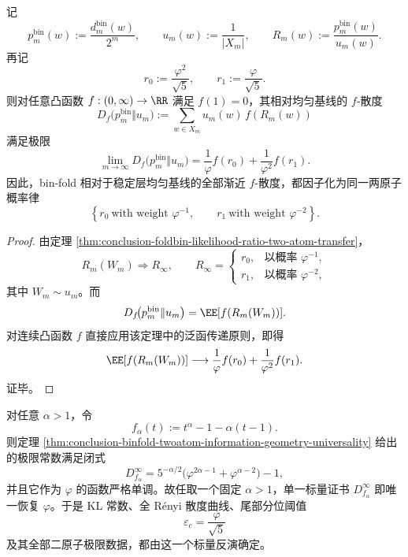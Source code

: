 \begin{theorem}\label{thm:conclusion-binfold-twoatom-information-geometry-universality}
记
\[
p_m^{\mathrm{bin}}(w):=\frac{d_m^{\mathrm{bin}}(w)}{2^m},
\qquad
u_m(w):=\frac{1}{|X_m|},
\qquad
R_m(w):=\frac{p_m^{\mathrm{bin}}(w)}{u_m(w)}.
\]
再记
\[
r_0:=\frac{\varphi^2}{\sqrt5},
\qquad
r_1:=\frac{\varphi}{\sqrt5}.
\]
则对任意凸函数 \(f:(0,\infty)\to\RR\) 满足 \(f(1)=0\)，其相对均匀基线的 \(f\)-散度
\[
D_f\!\bigl(p_m^{\mathrm{bin}}\Vert u_m\bigr)
:=
\sum_{w\in X_m}u_m(w)\,f(R_m(w))
\]
满足极限
\[
\lim_{m\to\infty}D_f\!\bigl(p_m^{\mathrm{bin}}\Vert u_m\bigr)
=
\frac1\varphi f(r_0)+\frac1{\varphi^2}f(r_1).
\]
因此，bin-fold 相对于稳定层均匀基线的全部渐近 \(f\)-散度，都因子化为同一两原子概率律
\[
\left\{
r_0\ \text{with weight }\varphi^{-1},
\qquad
r_1\ \text{with weight }\varphi^{-2}
\right\}.
\]
\end{theorem}

\begin{proof}
由定理 \ref{thm:conclusion-foldbin-likelihood-ratio-two-atom-transfer}，
\[
R_m(W_m)\Rightarrow R_\infty,
\qquad
R_\infty=
\begin{cases}
r_0,& \text{以概率 }\varphi^{-1},\\
r_1,& \text{以概率 }\varphi^{-2},
\end{cases}
\]
其中 \(W_m\sim u_m\)。而
\[
D_f\!\bigl(p_m^{\mathrm{bin}}\Vert u_m\bigr)=\EE[f(R_m(W_m))].
\]
对连续凸函数 \(f\) 直接应用该定理中的泛函传递原则，即得
\[
\EE[f(R_m(W_m))]
\longrightarrow
\frac1\varphi f(r_0)+\frac1{\varphi^2}f(r_1).
\]
证毕。
\end{proof}

\begin{corollary}[单一标量即可唯一恢复黄金参数]\label{cor:conclusion-binfold-single-scalar-recovers-golden-parameter}
对任意 \(\alpha>1\)，令
\[
f_\alpha(t):=t^\alpha-1-\alpha(t-1).
\]
则定理 \ref{thm:conclusion-binfold-twoatom-information-geometry-universality} 给出的极限常数满足闭式
\[
D_{f_\alpha}^{\infty}
=
5^{-\alpha/2}\bigl(\varphi^{2\alpha-1}+\varphi^{\alpha-2}\bigr)-1,
\]
并且它作为 \(\varphi\) 的函数严格单调。故任取一个固定 \(\alpha>1\)，单一标量证书 \(D_{f_\alpha}^{\infty}\) 即唯一恢复 \(\varphi\)。于是 KL 常数、全 Rényi 散度曲线、尾部分位阈值
\[
\varepsilon_c=\frac{\varphi}{\sqrt 5}
\]
及其全部二原子极限数据，都由这一个标量反演确定。
\end{corollary}

